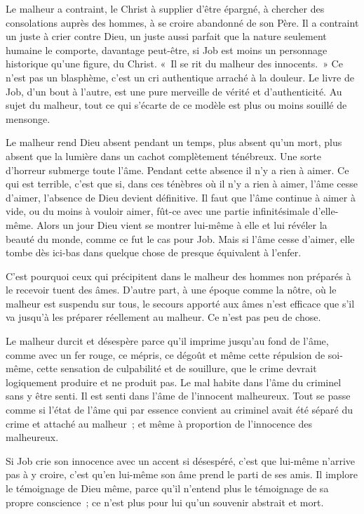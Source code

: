 \documentclass[french,twoside]{book} %
\begin{document}
Le malheur a contraint, le Christ à supplier d'être épargné, à chercher des consolations auprès des hommes, à se croire abandonné de son Père. Il a contraint un juste à crier contre Dieu, un juste aussi parfait que la nature seulement humaine le comporte, davantage peut-être, si Job est moins un personnage historique qu'une figure, du Christ. « Il se rit du malheur des innocents. » Ce n'est pas un blasphème, c'est un cri authentique arraché à la douleur. Le livre de Job, d'un bout à l'autre, est une pure merveille de vérité et d'authenticité. Au sujet du malheur, tout ce qui s'écarte de ce modèle est plus ou moins souillé de mensonge.\par
Le malheur rend Dieu absent pendant un temps, plus absent qu'un mort, plus absent que la lumière dans un cachot complètement ténébreux. Une sorte d'horreur submerge toute l'âme. Pendant cette absence il n'y a rien à aimer. Ce qui est terrible, c'est que si, dans ces ténèbres où il n'y a rien à aimer, l'âme cesse d'aimer, l'absence de Dieu devient définitive. Il faut que l'âme continue à aimer à vide, ou du moins à vouloir aimer, fût-ce avec une partie infinitésimale d'elle-même. Alors un jour Dieu vient se montrer lui-même à elle et lui révéler la beauté du monde, comme ce fut le cas pour Job. Mais si l'âme cesse d'aimer, elle tombe dès ici-bas dans quelque chose de presque équivalent à l'enfer.\par
C'est pourquoi ceux qui précipitent dans le malheur des hommes non préparés à le recevoir tuent des âmes. D'autre part, à une époque comme la nôtre, où le malheur est suspendu sur tous, le secours apporté aux âmes n'est efficace que s'il va jusqu'à les préparer réellement au malheur. Ce n'est pas peu de chose.\par
Le malheur durcit et désespère parce qu'il imprime jusqu'au fond de l'âme, comme avec un fer rouge, ce mépris, ce dégoût et même cette répulsion de soi-même, cette sensation de culpabilité et de souillure, que le crime devrait logiquement produire et ne produit pas. Le mal habite dans l'âme du criminel sans y être senti. Il est senti dans l'âme de l'innocent malheureux. Tout se passe comme si l'état de l'âme qui par essence convient au criminel avait été séparé du crime et attaché au malheur ; et même à proportion de l'innocence des malheureux.\par
Si Job crie son innocence avec un accent si désespéré, c'est que lui-même n'arrive pas à y croire, c'est qu'en lui-même son âme prend le parti de ses amis. Il implore le témoignage de Dieu même, parce qu'il n'entend plus le témoignage de sa propre conscience ; ce n'est plus pour lui qu'un souvenir abstrait et mort.\par
\end{document}

